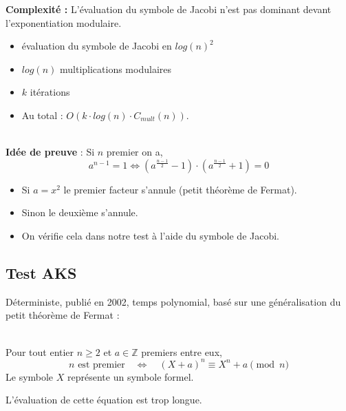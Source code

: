 			\begin{frame}
				\textbf{Complexité :} L'évaluation du symbole de Jacobi n'est pas dominant devant l'exponentiation modulaire.
				\begin{itemize}
				\item évaluation du symbole de Jacobi en $log(n)^{2}$
				\item $log(n)$ multiplications modulaires
				\item $k$ itérations
				\item Au total : $O(k \cdot log(n) \cdot C_{mult}(n))$.
				\end{itemize}
				~\\
				\textbf{Idée de preuve} : Si $n$ premier on a,
				\[
					a^{n - 1} = 1 \Leftrightarrow (a^{\frac{n - 1}{2}} - 1) \cdot (a^{\frac{n - 1}{2}} + 1) = 0
				\]
				
				\begin{itemize}
				\item Si $a = x^{2}$ le premier facteur s'annule (petit théorème de Fermat).
				\item Sinon le deuxième s'annule.
				\item On vérifie cela dans notre test à l'aide du symbole de Jacobi.
				\end{itemize}
			\end{frame}	
		
		\subsection{Test AKS}	
			\begin{frame}
			Déterministe, publié en 2002, temps polynomial, basé sur une généralisation du petit théorème de Fermat :\\~\\
			\begin{Th}
			\label{ThFermat4}
			Pour tout entier $n \geqslant 2$ et $a \in \mathbb{Z}$ premiers entre eux,
			\[n \text{  est premier} \quad \Leftrightarrow \quad (X + a)^{n} \equiv X^{n} + a \pmod n\] 
			Le symbole $X$ représente un symbole formel.
			\end{Th}
			L'évaluation de cette équation est trop longue.
			\end{frame}
			
